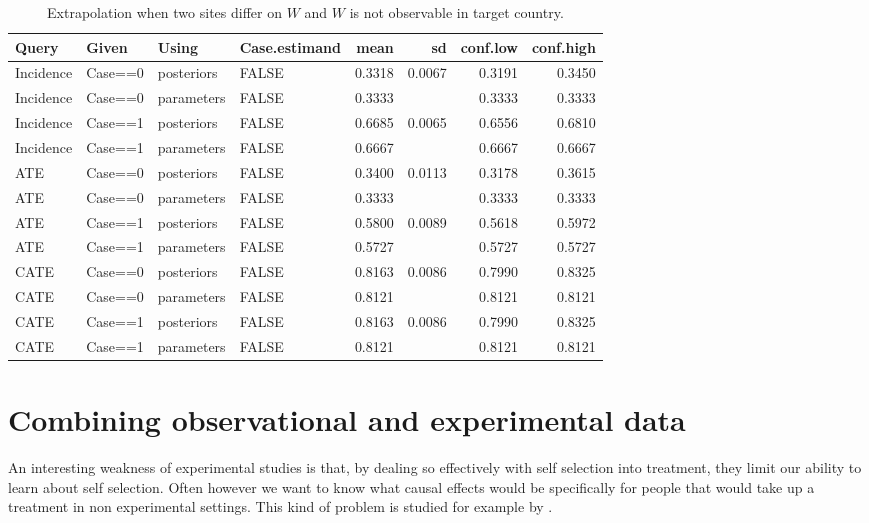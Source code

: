 \documentclass[
  12pt,
]{book}
\begin{document}
\begin{table}

\caption{\label{tab:unnamed-chunk-112}Extrapolation when two sites differ on $W$ and $W$ is not observable in target country.}
\centering
\begin{tabular}[t]{l|l|l|l|r|r|r|r}
\hline
Query & Given & Using & Case.estimand & mean & sd & conf.low & conf.high\\
\hline
Incidence & Case==0 & posteriors & FALSE & 0.3318 & 0.0067 & 0.3191 & 0.3450\\
\hline
Incidence & Case==0 & parameters & FALSE & 0.3333 &  & 0.3333 & 0.3333\\
\hline
Incidence & Case==1 & posteriors & FALSE & 0.6685 & 0.0065 & 0.6556 & 0.6810\\
\hline
Incidence & Case==1 & parameters & FALSE & 0.6667 &  & 0.6667 & 0.6667\\
\hline
ATE & Case==0 & posteriors & FALSE & 0.3400 & 0.0113 & 0.3178 & 0.3615\\
\hline
ATE & Case==0 & parameters & FALSE & 0.3333 &  & 0.3333 & 0.3333\\
\hline
ATE & Case==1 & posteriors & FALSE & 0.5800 & 0.0089 & 0.5618 & 0.5972\\
\hline
ATE & Case==1 & parameters & FALSE & 0.5727 &  & 0.5727 & 0.5727\\
\hline
CATE & Case==0 & posteriors & FALSE & 0.8163 & 0.0086 & 0.7990 & 0.8325\\
\hline
CATE & Case==0 & parameters & FALSE & 0.8121 &  & 0.8121 & 0.8121\\
\hline
CATE & Case==1 & posteriors & FALSE & 0.8163 & 0.0086 & 0.7990 & 0.8325\\
\hline
CATE & Case==1 & parameters & FALSE & 0.8121 &  & 0.8121 & 0.8121\\
\hline
\end{tabular}
\end{table}

\hypertarget{combining-observational-and-experimental-data}{%
\section{Combining observational and experimental data}\label{combining-observational-and-experimental-data}}

An interesting weakness of experimental studies is that, by dealing so effectively with self selection into treatment, they limit our ability to learn about self selection. Often however we want to know what causal effects would be specifically for people that would take up a treatment in non experimental settings. This kind of problem is studied for example by \citet{knox2019design}.
\end{document}
